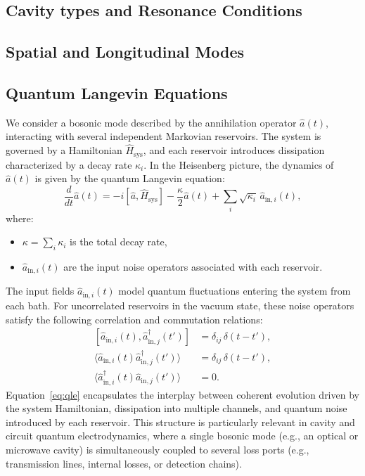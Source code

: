 \subsection{Cavity types and Resonance Conditions}
\subsection{Spatial and Longitudinal Modes}
\subsection{Quantum Langevin Equations}

We consider a bosonic mode described by the annihilation operator \(\hat{a}(t)\), interacting with several independent Markovian reservoirs. The system is governed by a Hamiltonian \(\hat{H}_\mathrm{sys}\), and each reservoir introduces dissipation characterized by a decay rate \(\kappa_i\). In the Heisenberg picture, the dynamics of \(\hat{a}(t)\) is given by the quantum Langevin equation:
%
\begin{equation}
\frac{d}{dt} \hat{a}(t) = -i [\hat{a}, \hat{H}_\mathrm{sys}] - \frac{\kappa}{2} \hat{a}(t) + \sum_i \sqrt{\kappa_i} \, \hat{a}_{\mathrm{in},i}(t),
\label{eq:qle}
\end{equation}
where:
\begin{itemize}
  \item \(\kappa = \sum_i \kappa_i\) is the total decay rate,
  \item \(\hat{a}_{\mathrm{in},i}(t)\) are the input noise operators associated with each reservoir.
\end{itemize}
The input fields \(\hat{a}_{\mathrm{in},i}(t)\) model quantum fluctuations entering the system from each bath. For uncorrelated reservoirs in the vacuum state, these noise operators satisfy the following correlation and commutation relations:
%
\begin{align}
\left[ \hat{a}_{\mathrm{in},i}(t), \hat{a}^\dagger_{\mathrm{in},j}(t') \right] &= \delta_{ij} \, \delta(t - t'), \\
\langle \hat{a}_{\mathrm{in},i}(t) \hat{a}^\dagger_{\mathrm{in},j}(t') \rangle &= \delta_{ij} \, \delta(t - t'), \\
\langle \hat{a}^\dagger_{\mathrm{in},i}(t) \hat{a}_{\mathrm{in},j}(t') \rangle &= 0.
\end{align}
Equation~\eqref{eq:qle} encapsulates the interplay between coherent evolution driven by the system Hamiltonian, dissipation into multiple channels, and quantum noise introduced by each reservoir. This structure is particularly relevant in cavity and circuit quantum electrodynamics, where a single bosonic mode (e.g., an optical or microwave cavity) is simultaneously coupled to several loss ports (e.g., transmission lines, internal losses, or detection chains).

